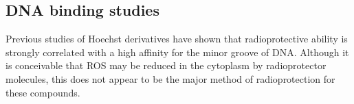 \begin{refsection}

\section{DNA binding studies}
Previous studies of Hoechst derivatives have shown that radioprotective ability is strongly correlated with a high affinity for the minor groove of DNA.\@
Although it is conceivable that ROS may be reduced in the cytoplasm by radioprotector molecules, this does not appear to be the major method of radioprotection for these compounds.


\end{refsection}
